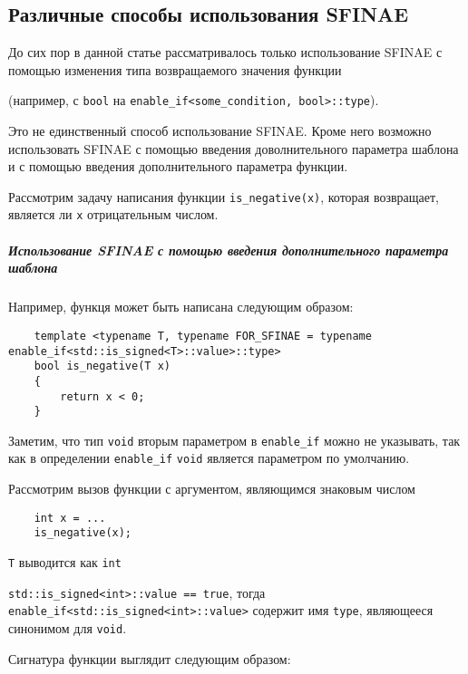 \subsection{Различные способы использования SFINAE}

	До сих пор в данной статье рассматривалось только использование SFINAE с помощью изменения типа возвращаемого значения функции 
	
	(например, с \texttt{bool} на \texttt{enable_if<some_condition, bool>::type}).
	
	Это не единственный способ использование SFINAE. Кроме него возможно использовать SFINAE с помощью введения доволнительного параметра шаблона и с помощью введения дополнительного параметра функции.
	
	Рассмотрим задачу написания функции \texttt{is_negative(x)}, которая возвращает, является ли \texttt{x} отрицательным числом.
	
\subparagraph{Использование SFINAE с помощью введения дополнительного параметра шаблона}

	Например, функця может быть написана следующим образом:
	
	\begin{verbatim}
	template <typename T, typename FOR_SFINAE = typename enable_if<std::is_signed<T>::value>::type>
	bool is_negative(T x)
	{
		return x < 0;
	}
	\end{verbatim}
	
	Заметим, что тип \texttt{void} вторым параметром в \texttt{enable_if} можно не указывать, так как в определении \texttt{enable_if} \texttt{void} является параметром по умолчанию.
	
	Рассмотрим вызов функции с аргументом, являющимся знаковым числом
	
	\begin{verbatim}
	int x = ...
	is_negative(x);
	\end{verbatim}
	
	\texttt{T} выводится как \texttt{int}
	
	\texttt{std::is_signed<int>::value == true}, тогда \texttt{enable_if<std::is_signed<int>::value>} содержит имя \texttt{type}, являющееся синонимом для \texttt{void}.
	
	Сигнатура функции выглядит следующим образом:
	
